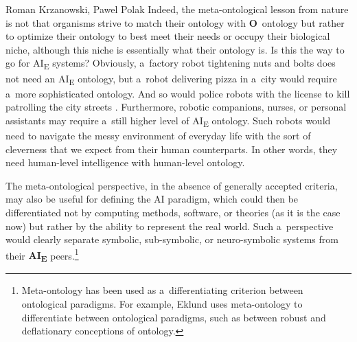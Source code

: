 \begin{artengenv2auth}{Roman Krzanowski, Pawel Polak}
Indeed, the meta-ontological lesson from nature is not that organisms strive to match their ontology with \textbf{O}~ontology but rather to optimize their ontology to best meet their needs
\parencite[see e.g.,][]{yong_immense_2022} %
 or occupy their biological niche, although this niche is essentially what their ontology is. Is this the way to go for AI\textsubscript{E} systems? Obviously, a~factory robot tightening nuts and bolts does not need an AI\textsubscript{E} ontology, but a~robot delivering pizza in a~city would require a~more sophisticated ontology. And so would police robots with the license to kill patrolling the city streets 
\parencite[see e.g.,][]{propper_san_2022}. %
 Furthermore, robotic companions, nurses, or personal assistants may require a~still higher level of AI\textsubscript{E} ontology. Such robots would need to navigate the messy environment of everyday life with the sort of cleverness that we expect from their human counterparts. In other words, they need human-level intelligence with human-level ontology.

The meta-ontological perspective, in the absence of generally accepted criteria, may also be useful for defining the AI paradigm, which could then be differentiated not by computing methods, software, or theories (as it is the case now) but rather by the ability to represent the real world. Such a~perspective would clearly separate symbolic, sub-symbolic, or neuro-symbolic systems from their \textbf{AI}\textbf{\textsubscript{E}} peers.\footnote{Meta-ontology has been used as a~differentiating criterion between ontological paradigms. For example, Eklund
\parencite*[][]{eklund_picture_2008} %
 uses meta-ontology to differentiate between ontological paradigms, such as between robust and deflationary conceptions of ontology.}




\end{artengenv2auth}
\label{krzanowpolak_stop}